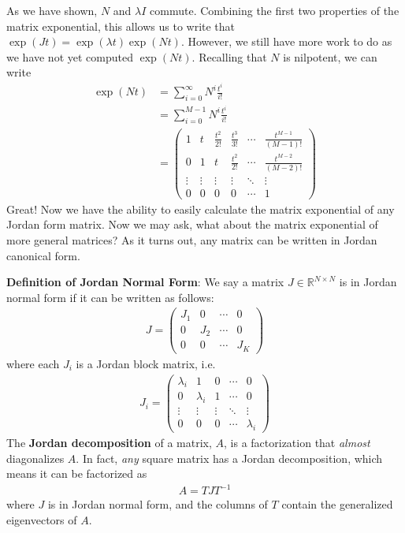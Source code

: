 \documentclass[a4paper,11pt]{exam}
\newcounter{ct}
\newcommand{\field}[1]{\ensuremath{\mathbb{#1}}}
\newcommand{\reals}{\field{R}}
\begin{document}
\begin{questions}
As we have shown, $N$ and $\lambda I$ commute.  Combining the first two properties of the matrix exponential, this allows us to write that $    \exp(J t) = \exp(\lambda t) \exp(N t)$.  However, we still have more work to do as we have not yet computed $\exp(Nt)$.  Recalling that $N$ is nilpotent, we can write
\begin{align}
    \exp(Nt) &= \sum_{i=0}^{\infty} N^i \frac{t^i}{i!}\\
    &= \sum_{i=0}^{M-1} N^i \frac{t^i}{i!}\\
    &= \begin{pmatrix} 1 & t & \frac{t^2}{2!} & \frac{t^3}{3!} & \cdots & \frac{t^{M-1}}{(M-1)!}\\
        0 & 1 & t & \frac{t^2}{2!} & \cdots & \frac{t^{M-2}}{(M-2)!}\\
        \vdots & \vdots & \vdots & \vdots & \ddots & \vdots\\
        0 & 0 & 0 & 0 & \cdots & 1
    \end{pmatrix}
\end{align}
Great! Now we have the ability to easily calculate the matrix exponential of any Jordan form matrix.  Now we may ask, what about the matrix exponential of more general matrices? As it turns out, any matrix can be written in Jordan canonical form.
\begin{tcolorbox}[colback=black!1!,title=Jordan normal form]
    \textbf{Definition of Jordan Normal Form}: We say a matrix $J \in \reals^{N \times N}$ is in Jordan normal form if it can be written as follows:
    \begin{align}
        J = \begin{pmatrix} J_1 & 0 & \cdots & 0\\
        0 & J_2 & \cdots & 0\\
        0 & 0 & \cdots & J_K\end{pmatrix}
    \end{align}
    where each $J_i$ is a Jordan block matrix, i.e.
    \begin{align}
        J_i = \begin{pmatrix} \lambda_i & 1 & 0 & \cdots & 0\\
            0 & \lambda_i & 1 & \cdots & 0\\
            \vdots & \vdots & \vdots & \ddots & \vdots\\
            0 & 0 & 0 & \cdots & \lambda_i
        \end{pmatrix}
    \end{align}
    The \textbf{Jordan decomposition} of a matrix, $A$, is a factorization that \textit{almost} diagonalizes $A$.  In fact, \textit{any} square matrix has a Jordan decomposition, which means it can be factorized as
    \begin{align}
        A = T J T^{-1}
    \end{align}
    where $J$ is in Jordan normal form, and the columns of $T$ contain the generalized eigenvectors of $A$.
\end{tcolorbox}


\end{questions}
\end{document}
